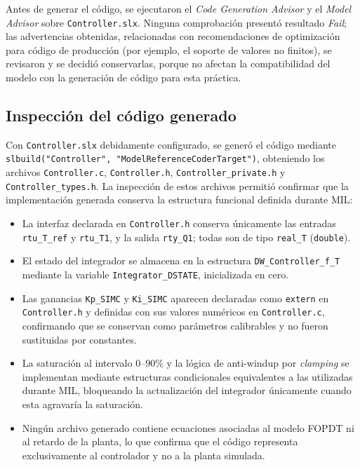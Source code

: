 \documentclass[journal]{IEEEtran}
\begin{document}
Antes de generar el código, se ejecutaron el \textit{Code Generation Advisor} y el
\textit{Model Advisor} sobre \texttt{Controller.slx}. Ninguna comprobación
presentó resultado \textit{Fail}; las advertencias obtenidas, relacionadas con
recomendaciones de optimización para código de producción (por ejemplo, el
soporte de valores no finitos), se revisaron y se decidió conservarlas, porque
no afectan la compatibilidad del modelo con la generación de código para esta
práctica.

\subsection{Inspección del código generado}
Con \texttt{Controller.slx} debidamente configurado, se generó el código
mediante \texttt{slbuild("Controller", "ModelReferenceCoderTarget")}, obteniendo
los archivos \texttt{Controller.c}, \texttt{Controller.h},
\texttt{Controller\_private.h} y \texttt{Controller\_types.h}. La inspección de
estos archivos permitió confirmar que la implementación generada conserva la
estructura funcional definida durante MIL:

\begin{itemize}
    \item La interfaz declarada en \texttt{Controller.h} conserva únicamente las
    entradas \texttt{rtu\_T\_ref} y \texttt{rtu\_T1}, y la salida
    \texttt{rty\_Q1}; todas son de tipo \texttt{real\_T} (\texttt{double}).
    \item El estado del integrador se almacena en la estructura
    \texttt{DW\_Controller\_f\_T} mediante la variable
    \texttt{Integrator\_DSTATE}, inicializada en cero.
    \item Las ganancias \texttt{Kp\_SIMC} y \texttt{Ki\_SIMC} aparecen declaradas
    como \texttt{extern} en \texttt{Controller.h} y definidas con sus valores
    numéricos en \texttt{Controller.c}, confirmando que se conservan como
    parámetros calibrables y no fueron sustituidas por constantes.
    \item La saturación al intervalo $0$--$90\%$ y la lógica de anti-windup por
    \textit{clamping} se implementan mediante estructuras condicionales
    equivalentes a las utilizadas durante MIL, bloqueando la actualización del
    integrador únicamente cuando esta agravaría la saturación.
    \item Ningún archivo generado contiene ecuaciones asociadas al modelo FOPDT
    ni al retardo de la planta, lo que confirma que el código representa
    exclusivamente al controlador y no a la planta simulada.
\end{itemize}
\end{document}
